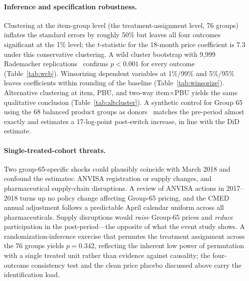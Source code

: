 \paragraph{Inference and specification robustness.}
Clustering at the item-group level (the treatment-assignment level, 76 groups) inflates the standard errors by roughly 50\% but leaves all four outcomes significant at the 1\% level; the $t$-statistic for the 18-month price coefficient is $7.3$ under this conservative clustering. A wild cluster bootstrap with 9{,}999 Rademacher replications~\citep{cameron2008} confirms $p<0.001$ for every outcome (Table~\ref{tab:wcb}). Winsorizing dependent variables at 1\%/99\% and 5\%/95\% leaves coefficients within rounding of the baseline (Table~\ref{tab:winsorize}). Alternative clustering at item, PBU, and two-way item$\times$PBU yields the same qualitative conclusion (Table~\ref{tab:altcluster}). A synthetic control for Group 65 using the 68 balanced product groups as donors~\citep{abadie2010, ben2021} matches the pre-period almost exactly and estimates a 17-log-point post-switch increase, in line with the DiD estimate.

\paragraph{Single-treated-cohort threats.}
Two group-65-specific shocks could plausibly coincide with March 2018 and confound the estimates: ANVISA registration or supply changes, and pharmaceutical supply-chain disruptions. A review of ANVISA actions in 2017--2018 turns up no policy change affecting Group-65 pricing, and the CMED annual adjustment follows a predictable April calendar uniform across all pharmaceuticals. Supply disruptions would \emph{raise} Group-65 prices and \emph{reduce} participation in the post-period---the opposite of what the event study shows. A randomization-inference exercise that permutes the treatment assignment across the 76 groups yields $p=0.342$, reflecting the inherent low power of permutation with a single treated unit rather than evidence against causality; the four-outcome consistency test and the clean price placebo discussed above carry the identification load.

